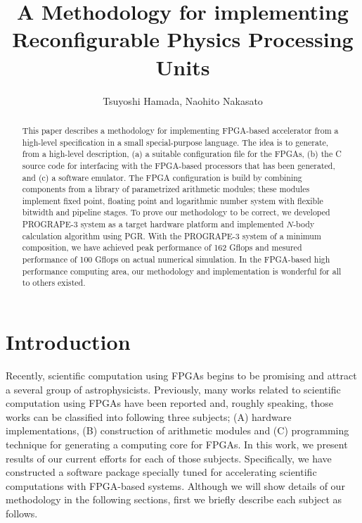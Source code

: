 \documentclass{llncs}
\begin{document}
\def\addtocontents#1#2{}%
\def\addcontentsline#1#2#3{}%
\def\markboth#1#2{}%
%
\title {A Methodology for implementing Reconfigurable Physics Processing Units}

\author{Tsuyoshi Hamada, Naohito Nakasato}


\maketitle
%
\begin{abstract}
This paper describes a methodology for implementing FPGA-based
accelerator from a high-level specification in a small special-purpose
language.  The idea is to generate, from a high-level description, (a)
a suitable configuration file for the FPGAs, (b) the C source code for
interfacing with the FPGA-based processors that has been generated,
and (c) a software emulator. The FPGA configuration is build by
combining components from a library of parametrized arithmetic
modules; these modules implement fixed point, floating point and
logarithmic number system with flexible bitwidth and pipeline stages. To
prove our methodology to be correct, we developed PROGRAPE-3 system as
a target hardware platform and implemented $N$-body calculation
algorithm using PGR.  With the PROGRAPE-3 system of a minimum
composition, we have achieved peak performance of 162 Gflops and
mesured performance of 100 Gflops on actual numerical simulation.
In the FPGA-based high performance computing area,
our methodology and implementation is wonderful for all to others existed.
\end{abstract}
%
\section{Introduction}
%

Recently, scientific computation using FPGAs begins to be promising
and attract a several group of astrophysicists.
Previously, many works related to scientific computation using FPGAs
have been reported and, roughly speaking, 
those works can be classified into following three subjects;
(A) hardware implementations, (B) construction of arithmetic modules
and (C) programming technique for generating a
computing core for FPGAs. 
In this work, we present results of our current efforts
for each of those subjects. 
Specifically, we have constructed a software package specially 
tuned for accelerating scientific computations with FPGA-based systems.
Although we will show details of our methodology in the following sections, 
first we briefly describe each subject as follows.
\end{document}
